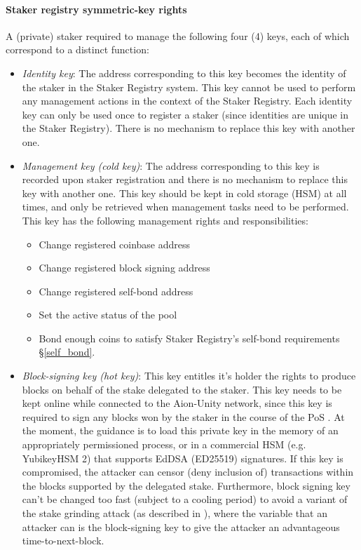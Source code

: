 \paragraph{Staker registry symmetric-key rights} \label{km_staker} A  (private) staker required to manage the following four (4) keys, each of which correspond to a distinct function: 
\begin{itemize}
    \item \textit{Identity key}: The address corresponding to this key becomes the identity of the staker in the Staker Registry system. This key cannot be used to perform any management actions in the context of the Staker Registry. Each identity key can only be used once to register a staker (since identities are unique in the Staker Registry). There is no mechanism to replace this key with another one.
    
    \item \textit{Management key (cold key)}: The address corresponding to this key is recorded upon staker registration and there is no mechanism to replace this key with another one. This key should be kept in cold storage (HSM) at all times, and only be retrieved when management tasks need to be performed. This key has the following management rights and responsibilities:
    \begin{itemize} [label=--,nosep]
        \item Change registered coinbase address
        \item Change registered block signing address
        \item Change registered self-bond address
        \item Set the active status of the pool
        \item Bond enough coins to satisfy Staker Registry's self-bond requirements \S\ref{self_bond}. 
    \end{itemize}
    
    \item \textit{Block-signing key (hot key)}: This key entitles it's holder the rights to produce blocks on behalf of the stake delegated to the staker. This key needs to be kept online while connected to the Aion-Unity network, since this key is required to sign any blocks won by the staker in the course of the PoS . At the moment, the guidance is to load this private key in the memory of an appropriately permissioned process, or in a commercial HSM (e.g. YubikeyHSM 2) that supports EdDSA (ED25519) signatures. If this key is compromised, the attacker can censor (deny inclusion of) transactions within the blocks supported by the delegated stake. Furthermore, block signing key can't be changed too fast (subject to a cooling period) to avoid a variant of the stake grinding attack (as described in \cite{WZS19}), where the variable that an attacker can  is the block-signing key to give the attacker an advantageous time-to-next-block. 
    

\end{itemize}
